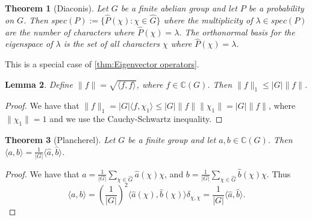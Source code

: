 \documentclass[]{article}
\newtheorem{theorem}{Theorem}
\newtheorem{lemma}[theorem]{Lemma}
\theoremstyle{definition}
\numberwithin{theorem}{section}
\numberwithin{equation}{section}
\begin{document}
\begin{theorem}[Diaconis]
	\label{thm:Diaconis}
	Let $G$ be a finite abelian group and let $P$ be a probability on $G$. Then $spec(P) := \lbrace \widehat{P}(\chi) : \chi \in \widehat{G} \rbrace$ where the multiplicity of $\lambda \in spec(P)$ are the number of characters where $\widehat{P}(\chi) = \lambda$. The orthonormal basis for the eigenspace of $\lambda$ is the set of all characters $\chi$ where $\widehat{P}(\chi) = \lambda$. 
\end{theorem}
This is a special case of \cref{thm:Eigenvector operators}.

\begin{lemma}
	\label{lem:Absolute Value Inequality}
	Define $\|f\| = \sqrt{\langle f, f \rangle}$, where $f \in \mathbb{C}(G)$. Then $\|f \|_1 \leq |G| \|f \|$.
\end{lemma}
\begin{proof}
	We have that $\|f \|_1 = |G| \langle f, \chi_1 \rangle \leq |G| \|f \| \|\chi_1 \| = |G| \|f \|$, where $\|\chi_1 \| = 1$ and we use the Cauchy-Schwartz inequality. 
\end{proof}

\begin{theorem}[Plancherel]
	\label{thm:Plancherel}
	Let $G$ be a finite group and let $a, b \in \mathbb{C}(G)$. Then $\langle a, b \rangle = \frac{1}{|G|} \langle \widehat{a}, \widehat{b} \rangle$. 
\end{theorem}
\begin{proof}
	We have that $a =\frac{1}{|G|} \sum_{\chi \in \widehat{G}} \widehat{a}(\chi) \chi$, and $b = \frac{1}{|G|} \sum_{\chi \in \widehat{G}} \widehat{b}(\chi) \chi$. Thus \begin{equation}
		\langle a, b \rangle = \left(\frac{1}{|G|}\right)^2 \langle \widehat{a}(\chi), \widehat{b}(\chi) \rangle \delta_{\chi, \chi} = \frac{1}{|G|} \langle \widehat{a}, \widehat{b} \rangle.
	\end{equation}

\end{proof}
\end{document}
